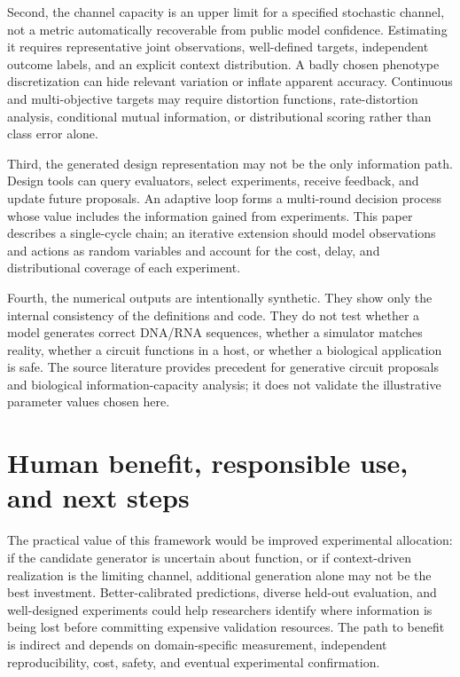 \documentclass[11pt]{article}
\begin{document}
Second, the channel capacity is an upper limit for a specified stochastic channel, not a metric automatically recoverable from public model confidence. Estimating it requires representative joint observations, well-defined targets, independent outcome labels, and an explicit context distribution. A badly chosen phenotype discretization can hide relevant variation or inflate apparent accuracy. Continuous and multi-objective targets may require distortion functions, rate-distortion analysis, conditional mutual information, or distributional scoring rather than class error alone.

Third, the generated design representation may not be the only information path. Design tools can query evaluators, select experiments, receive feedback, and update future proposals. An adaptive loop forms a multi-round decision process whose value includes the information gained from experiments. This paper describes a single-cycle chain; an iterative extension should model observations and actions as random variables and account for the cost, delay, and distributional coverage of each experiment.

Fourth, the numerical outputs are intentionally synthetic. They show only the internal consistency of the definitions and code. They do not test whether a model generates correct DNA/RNA sequences, whether a simulator matches reality, whether a circuit functions in a host, or whether a biological application is safe. The source literature provides precedent for generative circuit proposals and biological information-capacity analysis; it does not validate the illustrative parameter values chosen here.

\section{Human benefit, responsible use, and next steps}
The practical value of this framework would be improved experimental allocation: if the candidate generator is uncertain about function, or if context-driven realization is the limiting channel, additional generation alone may not be the best investment. Better-calibrated predictions, diverse held-out evaluation, and well-designed experiments could help researchers identify where information is being lost before committing expensive validation resources. The path to benefit is indirect and depends on domain-specific measurement, independent reproducibility, cost, safety, and eventual experimental confirmation.
\end{document}
